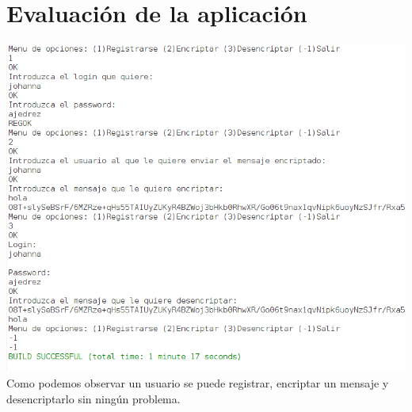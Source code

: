 \documentclass[11pt]{article}
\begin{document}
\newpage
\section{Evaluaci\'on de la aplicaci\'on}
\includegraphics[width=16cm]{captura}
Como podemos observar un usuario se puede registrar, encriptar un mensaje y desencriptarlo sin ning\'un problema.
\end{document}
